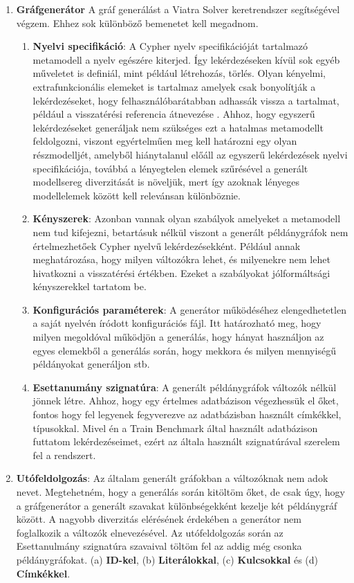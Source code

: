 \begin{enumerate}
	\item \textbf{Gráfgenerátor}
	A gráf generálást a Viatra Solver keretrendszer  segítségével végzem. Ehhez sok különböző bemenetet kell megadnom. 
	\begin{enumerate}
		\item\textbf{Nyelvi specifikáció}: A Cypher nyelv specifikációját tartalmazó metamodell a nyelv egészére kiterjed. Így lekérdezéseken kívül sok egyéb műveletet is definiál, mint például létrehozás, törlés. Olyan kényelmi, extrafunkcionális elemeket is tartalmaz amelyek csak bonyolítják a lekérdezéseket, hogy felhasználóbarátabban adhassák vissza a tartalmat, például a visszatérési referencia átnevezése . Ahhoz, hogy egyszerű lekérdezéseket generáljak nem szükséges ezt a hatalmas metamodellt feldolgozni, viszont egyértelműen meg kell határozni egy olyan részmodelljét, amelyből hiánytalanul előáll az egyszerű lekérdezések nyelvi specifikációja, továbbá a lényegtelen elemek szűrésével a generált modellsereg diverzitását is növeljük, mert így azoknak lényeges modellelemek között kell relevánsan különböznie. 
		\item\textbf{Kényszerek}: Azonban vannak	olyan szabályok amelyeket a metamodell nem tud kifejezni, betartásuk nélkül viszont a generált példánygráfok nem értelmezhetőek Cypher nyelvű lekérdezésekként. Például annak meghatározása, hogy milyen változókra lehet, és milyenekre nem lehet hivatkozni a visszatérési értékben. Ezeket a szabályokat jólformáltsági kényszerekkel tartatom be. 
		\item\textbf{Konfigurációs paraméterek}: A generátor működéséhez elengedhetetlen a saját nyelvén íródott konfigurációs fájl. Itt határozható meg, hogy milyen megoldóval működjön a generálás, hogy hányat használjon az egyes elemekből a generálás során, hogy mekkora és milyen mennyiségű példányokat generáljon stb.  
		\item\textbf{Esettanumány szignatúra}: A generált példánygráfok változók nélkül jönnek létre. Ahhoz, hogy egy értelmes adatbázison végezhessük el őket, fontos hogy fel legyenek fegyverezve az adatbázisban használt címkékkel, típusokkal. Mivel én a Train Benchmark által használt adatbázison futtatom lekérdezéseimet, ezért az általa használt szignatúrával szerelem fel a rendszert. 
	\end{enumerate}
	\item \textbf{Utófeldolgozás}: Az általam generált gráfokban a változóknak nem adok nevet. Megtehetném, hogy a generálás során kitöltöm őket, de csak úgy, hogy a gráfgenerátor a generált szavakat különbségekként kezelje két példánygráf között. A nagyobb diverzitás elérésének érdekében a generátor nem foglalkozik a változók elnevezésével. Az utófeldolgozás során az Esettanulmány szignatúra szavaival töltöm fel az addig még csonka példánygráfokat. (a) \textbf{ID-kel}, (b) \textbf{Literálokkal}, (c) \textbf{Kulcsokkal} és (d) \textbf{Címkékkel}.   

\end{enumerate}
